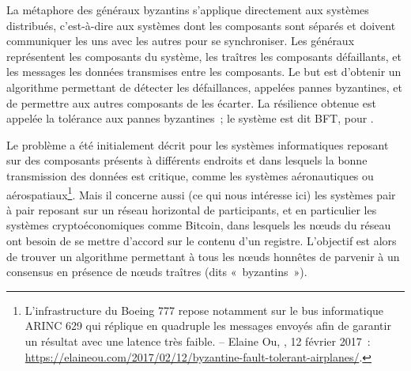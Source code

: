 

La métaphore des généraux byzantins s'applique directement aux systèmes distribués, c'est-à-dire aux systèmes dont les composants sont séparés et doivent communiquer les uns avec les autres pour se synchroniser. Les généraux représentent les composants du système, les traîtres les composants défaillants, et les messages les données transmises entre les composants. Le but est d'obtenir un algorithme permettant de détecter les défaillances, appelées pannes byzantines, et de permettre aux autres composants de les écarter. La résilience obtenue est appelée la tolérance aux pannes byzantines~; le système est dit BFT, pour .

Le problème a été initialement décrit pour les systèmes informatiques reposant sur des composants présents à différents endroits et dans lesquels la bonne transmission des données est critique, comme les systèmes aéronautiques ou aérospatiaux\footnote{L'infrastructure du Boeing 777 repose notamment sur le bus informatique ARINC 629 qui réplique en quadruple les messages envoyés afin de garantir un résultat avec une latence très faible. -- Elaine Ou, , 12 février 2017~: \url{https://elaineou.com/2017/02/12/byzantine-fault-tolerant-airplanes/}.}. Mais il concerne aussi (ce qui nous intéresse ici) les systèmes pair à pair reposant sur un réseau horizontal de participants, et en particulier les systèmes cryptoéconomiques comme Bitcoin, dans lesquels les nœuds du réseau ont besoin de se mettre d'accord sur le contenu d'un registre. L'objectif est alors de trouver un algorithme permettant à tous les nœuds honnêtes de parvenir à un consensus en présence de nœuds traîtres (dits «~byzantins~»).

